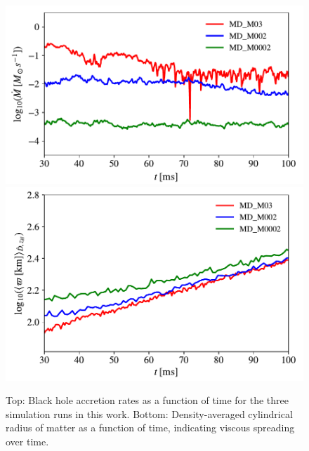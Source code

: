 \begin{figure}[t]
  \includegraphics[width=\columnwidth]{figures/kilonova/Mdot_acc_multidets_sims.pdf}
  \includegraphics[width=\columnwidth]{figures/kilonova/mean_radius_multi_densav_log.pdf}
 \caption{Top: Black hole accretion rates as a function of time for the three simulation runs in this work. Bottom: Density-averaged cylindrical radius of matter as a function of time, indicating viscous spreading over time. \label{fig:mdot-t}}
\end{figure}


